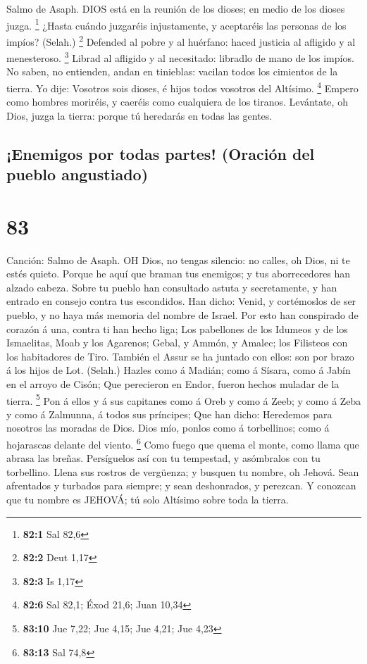  Salmo de Asaph. DIOS está en la reunión de los dioses; en
medio de los dioses juzga. \footnote{\textbf{82:1} Sal 82,6}
 ¿Hasta cuándo juzgaréis injustamente, y aceptaréis las
personas de los impíos? (Selah.) \footnote{\textbf{82:2} Deut 1,17}
 Defended al pobre y al huérfano: haced justicia al afligido
y al menesteroso. \footnote{\textbf{82:3} Is 1,17}  Librad
al afligido y al necesitado: libradlo de mano de los impíos.
 No saben, no entienden, andan en tinieblas: vacilan todos
los cimientos de la tierra.  Yo dije: Vosotros sois dioses,
é hijos todos vosotros del Altísimo. \footnote{\textbf{82:6} Sal 82,1;
  Éxod 21,6; Juan 10,34}  Empero como hombres moriréis, y
caeréis como cualquiera de los tiranos.  Levántate, oh Dios,
juzga la tierra: porque tú heredarás en todas las gentes.

\hypertarget{enemigos-por-todas-partes-oraciuxf3n-del-pueblo-angustiado}{%
\subsection{¡Enemigos por todas partes! (Oración del pueblo
angustiado)}\label{enemigos-por-todas-partes-oraciuxf3n-del-pueblo-angustiado}}

\hypertarget{section-82}{%
\section{83}\label{section-82}}

 Canción: Salmo de Asaph. OH Dios, no tengas silencio: no
calles, oh Dios, ni te estés quieto.  Porque he aquí que
braman tus enemigos; y tus aborrecedores han alzado cabeza. 
Sobre tu pueblo han consultado astuta y secretamente, y han entrado en
consejo contra tus escondidos.  Han dicho: Venid, y
cortémoslos de ser pueblo, y no haya más memoria del nombre de Israel.
 Por esto han conspirado de corazón á una, contra ti han
hecho liga;  Los pabellones de los Idumeos y de los
Ismaelitas, Moab y los Agarenos;  Gebal, y Ammón, y Amalec;
los Filisteos con los habitadores de Tiro.  También el Assur
se ha juntado con ellos: son por brazo á los hijos de Lot. (Selah.)
 Hazles como á Madián; como á Sísara, como á Jabín en el
arroyo de Cisón;  Que perecieron en Endor, fueron hechos
muladar de la tierra. \footnote{\textbf{83:10} Jue 7,22; Jue 4,15; Jue
  4,21; Jue 4,23}  Pon á ellos y á sus capitanes como á
Oreb y como á Zeeb; y como á Zeba y como á Zalmunna, á todos sus
príncipes;  Que han dicho: Heredemos para nosotros las
moradas de Dios.  Dios mío, ponlos como á torbellinos; como
á hojarascas delante del viento. \footnote{\textbf{83:13} Sal 74,8}
 Como fuego que quema el monte, como llama que abrasa las
breñas.  Persíguelos así con tu tempestad, y asómbralos con
tu torbellino.  Llena sus rostros de vergüenza; y busquen
tu nombre, oh Jehová.  Sean afrentados y turbados para
siempre; y sean deshonrados, y perezcan.  Y conozcan que tu
nombre es JEHOVÁ; tú solo Altísimo sobre toda la tierra.

